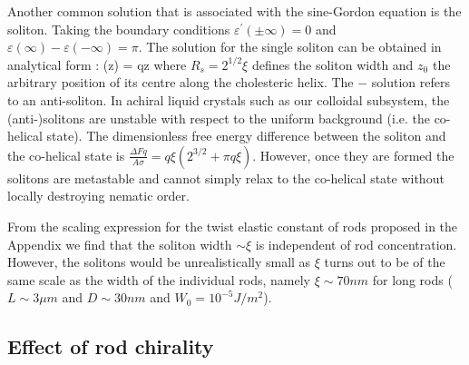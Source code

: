 Another common solution that is associated with the sine-Gordon equation is the soliton. Taking the boundary conditions $\varepsilon^{\prime}(\pm \infty) = 0$ and $\varepsilon(\infty) - \varepsilon(-\infty)  = \pi$. The solution for the single soliton can be obtained in analytical form  \cite{kamien2001order}:
\beq
\phi(z) =  qz \pm {}  \arctan {}
\eeq
where $ R_{s} = 2^{1/2} \xi$ defines the soliton width and $z_{0}$ the arbitrary position of its centre along the cholesteric helix. The $-$ solution refers to an anti-soliton. In achiral liquid crystals such as our colloidal subsystem, the (anti-)solitons are unstable with respect to the uniform background (i.e. the co-helical state). The dimensionless free energy difference between the soliton and the co-helical state is  $\tfrac{\Delta Fq}{ A \sigma} = q \xi (2^{3/2} + \pi q\xi)$. However, once they are formed the solitons are metastable and cannot simply relax to the co-helical state without locally destroying nematic order.

From the scaling expression  for the twist elastic constant of rods proposed in the Appendix we find that the soliton width $\sim \xi$ is independent of rod concentration. However, the solitons would be unrealistically small as $\xi $ turns out to be of the same scale as the width of the individual rods, namely  $\xi \sim 70 nm$ for long rods ($L \sim 3 \mu m$ and $D \sim 30 nm$ and $W_{0} = 10^{-5} J/m^{2}$).


\subsection{Effect of rod chirality}

